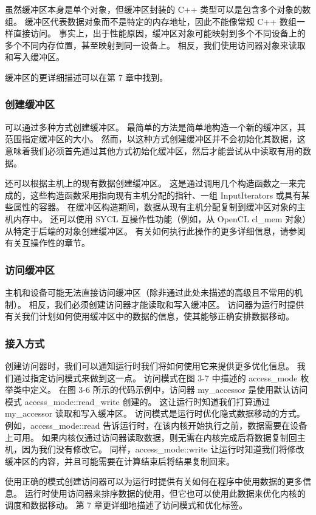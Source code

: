 虽然缓冲区本身是单个对象，但缓冲区封装的 C++ 类型可以是包含多个对象的数组。 缓冲区代表数据对象而不是特定的内存地址，因此不能像常规 C++ 数组一样直接访问。 事实上，出于性能原因，缓冲区对象可能映射到多个不同设备上的多个不同内存位置，甚至映射到同一设备上。 相反，我们使用访问器对象来读取和写入缓冲区。

缓冲区的更详细描述可以在第 7 章中找到。

\subsubsection{创建缓冲区}
可以通过多种方式创建缓冲区。 最简单的方法是简单地构造一个新的缓冲区，其范围指定缓冲区的大小。 然而，以这种方式创建缓冲区并不会初始化其数据，这意味着我们必须首先通过其他方式初始化缓冲区，然后才能尝试从中读取有用的数据。

还可以根据主机上的现有数据创建缓冲区。 这是通过调用几个构造函数之一来完成的，这些构造函数采用指向现有主机分配的指针、一组 InputIterators 或具有某些属性的容器。 在缓冲区构造期间，数据从现有主机分配复制到缓冲区对象的主机内存中。 还可以使用 SYCL 互操作性功能（例如，从 OpenCL cl\_mem 对象）从特定于后端的对象创建缓冲区。 有关如何执行此操作的更多详细信息，请参阅有关互操作性的章节。

\subsubsection{访问缓冲区}
主机和设备可能无法直接访问缓冲区（除非通过此处未描述的高级且不常用的机制）。 相反，我们必须创建访问器才能读取和写入缓冲区。 访问器为运行时提供有关我们计划如何使用缓冲区中的数据的信息，使其能够正确安排数据移动。

\subsubsection{接入方式}
创建访问器时，我们可以通知运行时我们将如何使用它来提供更多优化信息。 我们通过指定访问模式来做到这一点。 访问模式在图 3-7 中描述的 access\_mode 枚举类中定义。 在图 3-6 所示的代码示例中，访问器 my\_accessor 是使用默认访问模式 access\_mode::read\_write 创建的。 这让运行时知道我们打算通过 my\_accessor 读取和写入缓冲区。 访问模式是运行时优化隐式数据移动的方式。 例如，access\_mode::read 告诉运行时，在该内核开始执行之前，数据需要在设备上可用。 如果内核仅通过访问器读取数据，则无需在内核完成后将数据复制回主机，因为我们没有修改它。 同样，access\_mode::write 让运行时知道我们将修改缓冲区的内容，并且可能需要在计算结束后将结果复制回来。

使用正确的模式创建访问器可以为运行时提供有关如何在程序中使用数据的更多信息。 运行时使用访问器来排序数据的使用，但它也可以使用此数据来优化内核的调度和数据移动。 第 7 章更详细地描述了访问模式和优化标签。

